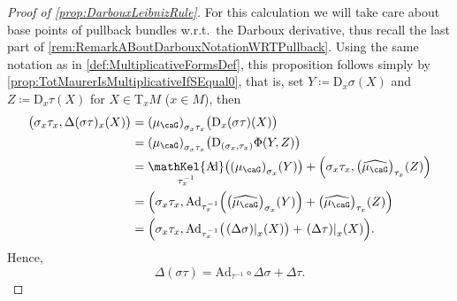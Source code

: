 \documentclass[reqno,a4paper,oneside]{amsart}
\newcommand\mutot{\mu_\caG}
\theoremstyle{plain}
\theoremstyle{remark}
\theoremstyle{definition}
\def\bas#1\eas{\begin{align*}#1\end{align*}}
\DeclareMathOperator{\sAd}{\mathKel{A\mkern-5.5mu d}}
\begin{document}
\begin{proof}[Proof of \ref{prop:DarbouxLeibnizRule}]
\leavevmode\newline
For this calculation we will take care about base points of pullback bundles w.r.t.\ the Darboux derivative, thus recall the last part of \ref{rem:RemarkABoutDarbouxNotationWRTPullback}. Using the same notation as in \ref{def:MultiplicativeFormsDef}, this proposition follows simply by \ref{prop:TotMaurerIsMultiplicativeIfSEqual0}, that is, set $Y \coloneqq \mathrm{D}_x\sigma(X)$ and $Z \coloneqq \mathrm{D}_x\tau(X)$ for $X \in \mathrm{T}_xM$ ($x \in M$), then
\begin{align*}
\bigl( \sigma_x\tau_x, \Delta(\sigma\tau)_x(X) \bigr)
&=
\mleft(\mutot\mright)_{\sigma_x\tau_x}\bigl( \mathrm{D}_x(\sigma \tau)(X) \bigr)
\\
&=
\mleft(\mutot\mright)_{\sigma_x\tau_x}\bigl( \mathrm{D}_{(\sigma_x, \tau_x)}\Phi(Y, Z) \bigr)
\\
&=
\sAd_{\tau_{x}^{-1}}\mleft(\mleft(\mutot\mright)_{\sigma_x}(Y)\mright)
		+ \mleft( \sigma_x\tau_x, \mleft( \widehat{\mutot}\mright)_{\tau_x} (Z) \mright)
\\
&=
\mleft( 
	\sigma_x\tau_x, 
	\mathrm{Ad}_{\tau_x^{-1}}\mleft( \mleft( \widehat{\mutot}\mright)_{\sigma_x} (Y) \mright) 
	+ \mleft( \widehat{\mutot}\mright)_{\tau_x} (Z) 
\mright)
\\
&=
\mleft( 
	\sigma_x\tau_x, 
	\mathrm{Ad}_{\tau_x^{-1}}\bigl( \mleft.\mleft( \Delta \sigma \mright)\mright|_x(X) \bigr) 
	+ \mleft.\mleft( \Delta \tau \mright)\mright|_x(X)
\mright).
\end{align*}
Hence,
\begin{equation*}
\Delta(\sigma \tau)
=
\mathrm{Ad}_{\tau^{-1}} \circ \Delta \sigma
	+ \Delta\tau.
\end{equation*}
%

\end{proof}
\end{document}
